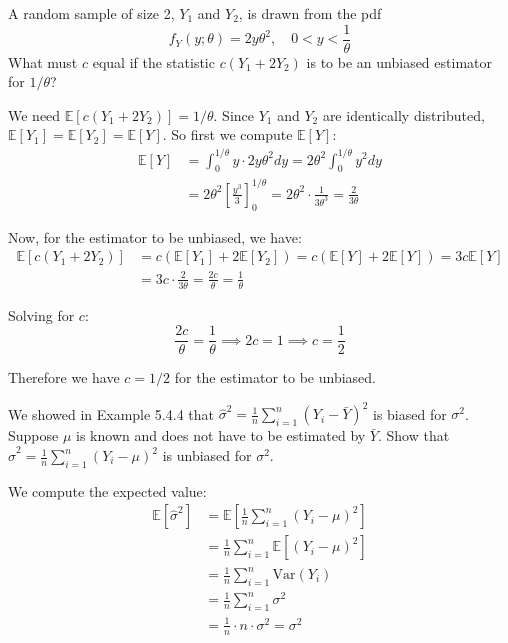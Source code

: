 \documentclass{article}
\newcommand{\E}{\mathbb{E}}
\newcommand{\V}{\text{Var}}
\begin{document}
\begin{probset}
\begin{prob}[\textbf{5.4.9}]
    A random sample of size 2, $Y_1$ and $Y_2$, is drawn from the pdf \[f_Y(y; \theta) = 2y\theta^2, \quad 0 < y < \frac{1}{\theta}\] What must $c$ equal if the statistic $c(Y_1 + 2Y_2)$ is to be an unbiased estimator for $1/\theta$?

    \begin{soln}
        We need $\E[c(Y_1 + 2Y_2)] = 1/\theta$. Since $Y_1$ and $Y_2$ are identically distributed, $\E[Y_1] = \E[Y_2] = \E[Y]$. So first we compute $\E[Y]$:
        \begin{align*}
            \E[Y] &= \int_0^{1/\theta} y \cdot 2y\theta^2 dy = 2\theta^2 \int_0^{1/\theta} y^2 dy \\
            &= 2\theta^2 \left[\frac{y^3}{3}\right]_0^{1/\theta} = 2\theta^2 \cdot \frac{1}{3\theta^3} = \frac{2}{3\theta}
        \end{align*}
        
        Now, for the estimator to be unbiased, we have:
        \begin{align*}
            \E[c(Y_1 + 2Y_2)] &= c(\E[Y_1] + 2\E[Y_2]) = c(\E[Y] + 2\E[Y]) = 3c\E[Y] \\
            &= 3c \cdot \frac{2}{3\theta} = \frac{2c}{\theta} = \frac{1}{\theta}
        \end{align*}
        
        Solving for $c$:
        \[
            \frac{2c}{\theta} = \frac{1}{\theta} \implies 2c = 1 \implies c = \frac{1}{2}
        \]
        
        Therefore we have $c = 1/2$ for the estimator to be unbiased.
    \end{soln}
\end{prob}

\begin{prob}[\textbf{5.4.12}]
    We showed in Example 5.4.4 that $\hat{\sigma}^2 = \frac{1}{n} \sum_{i=1}^n (Y_i - \bar{Y})^2$ is biased for $\sigma^2$. Suppose $\mu$ is known and does not have to be estimated by $\bar{Y}$. Show that $\hat{\sigma}^2 = \frac{1}{n} \sum_{i=1}^n (Y_i - \mu)^2$ is unbiased for $\sigma^2$.

    \begin{soln}
        We compute the expected value:
        \begin{align*}
            \E[\hat{\sigma}^2] &= \E\left[\frac{1}{n} \sum_{i=1}^n (Y_i - \mu)^2\right] \\
            &= \frac{1}{n} \sum_{i=1}^n \E[(Y_i - \mu)^2] \\
            &= \frac{1}{n} \sum_{i=1}^n \V(Y_i) \\
            &= \frac{1}{n} \sum_{i=1}^n \sigma^2 \\
            &= \frac{1}{n} \cdot n \cdot \sigma^2 = \sigma^2
        \end{align*}
        

\end{soln}
\end{prob}
\end{probset}
\end{document}
